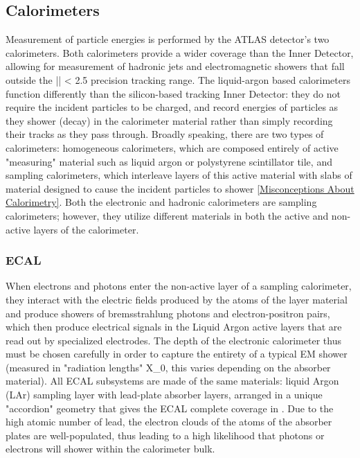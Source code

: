 \subsection{Calorimeters} \label{sec:Calos} 

Measurement of particle energies is performed by the ATLAS detector's two calorimeters. Both calorimeters provide a wider \eta coverage than the Inner Detector, allowing for measurement of hadronic jets and electromagnetic showers that fall outside the |\eta| < 2.5 precision tracking range. The liquid-argon based calorimeters function differently than the silicon-based tracking Inner Detector: they do not require the incident particles to be charged, and record energies of particles as they shower (decay) in the calorimeter material rather than simply recording their tracks as they pass through. Broadly speaking, there are two types of calorimeters: homogeneous calorimeters, which are composed entirely of active "measuring" material such as liquid argon or polystyrene scintillator tile, and sampling calorimeters, which interleave layers of this active material with slabs of material designed to cause the incident particles to shower \ref{Misconceptions About Calorimetry}. Both the electronic and hadronic calorimeters are sampling calorimeters; however, they utilize different materials in both the active and non-active layers of the calorimeter.

\subsubsection{ECAL} \label{sec:ECAL} 

When electrons and photons enter the non-active layer of a sampling calorimeter, they interact with the electric fields produced by the atoms of the layer material and produce showers of bremsstrahlung photons and electron-positron pairs, which then produce electrical signals in the Liquid Argon active layers that are read out by specialized electrodes. The depth of the electronic calorimeter thus must be chosen carefully in order to capture the entirety of a typical EM shower (measured in "radiation lengths" X_0, this varies depending on the absorber material). All ECAL subsystems are made of the same materials: liquid Argon (LAr) sampling layer with lead-plate absorber layers, arranged in a unique "accordion" geometry that gives the ECAL complete coverage in \phi . Due to the high atomic number of lead, the electron clouds of the atoms of the absorber plates are well-populated, thus leading to a high likelihood that photons or electrons will shower within the calorimeter bulk.

